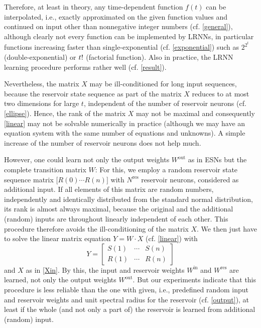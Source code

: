 \documentclass{sn-jnl}
\theoremstyle{definition}
\begin{document}

Therefore, at least in theory, any time-dependent function $f(t)$ can be
interpolated, i.e., exactly approximated on the given function values and
continued on input other than nonnegative integer numbers (cf. \cref{general}),
although clearly not every function can be implemented by LRNNs, in particular
functions increasing faster than single-exponential (cf. \cref{exponential})
such as $2^{2^t}$ (double-exponential) or $t\/!$ (factorial function). Also in
practice, the LRNN learning procedure performs rather well (cf. \cref{result}).

Nevertheless, the matrix $X$ may be ill-conditioned for long input sequences, because the reservoir state
sequence as part of the matrix $X$ reduces to at most two dimensions for large
$t$, independent of the number of reservoir neurons (cf. \cref{ellipse}). Hence,
the rank of the matrix $X$ may not be maximal and consequently \cref{linear} may not
be solvable numerically in practice (although we may have an equation system with
the same number of equations and unknowns). A simple increase of the number of
reservoir neurons does not help much.

However, one could learn not only the output weights $W^\mathrm{out}$ as in ESNs
but the complete transition matrix $W$: For this, we employ a random reservoir
state sequence matrix $\big[R(0) \cdots R(n) \big]$ with $N^\mathrm{res}$
reservoir neurons, considered as additional input. If all elements of this
matrix are random numbers, independently and identically distributed from the
standard normal distribution, its rank is almost always maximal, because the
original and the additional (random) inputs are throughout linearly independent
of each other. This procedure therefore avoids the ill-conditioning of the
matrix $X$. We then just have to solve the linear matrix equation $Y = W \cdot
X$ (cf. \cref{linear}) with
\[ Y = \left[ \begin{array}{ccc}
	S(1) & \cdots & S(n)\\
	R(1) & \cdots & R(n)
\end{array} \right] \]
and $X$ as in \cref{Xin}. By this, the input and reservoir weights
$W^\mathrm{in}$ and $W^\mathrm{res}$ are learned, not only the output weights
$W^\mathrm{out}$. But our experiments indicate that this procedure is less
reliable than the one with given, i.e., predefined random input and reservoir
weights and unit spectral radius for the reservoir (cf. \cref{output}), at least
if the whole (and not only a part of) the reservoir is learned from additional
(random) input.
\end{document}
